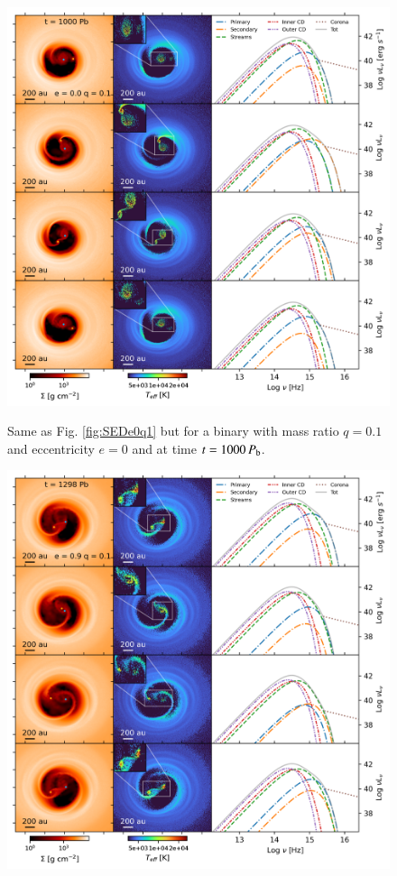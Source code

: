 \documentclass{aa}
\begin{document}
\begin{appendix}
\begin{figure}
    \includegraphics[width=\textwidth]{Figures/e0q01_hr01_md001_10059_PgasPrad.pdf} \\
    \caption{ Same as Fig. \ref{fig:SEDe0q1} but for a binary with  mass ratio $q=0.1$ and eccentricity $e=0$ and at time $t = 1000 \, P_{\rm b}$.}
    \label{fig:SEDe0q01}
\end{figure}
\begin{figure}
    \begin{center}
    \includegraphics[width=\textwidth]{Figures/e09q01_hr01_md001_3a_12989_PgasPrad.pdf} \\

\end{center}
\end{figure}
\end{appendix}
\end{document}
